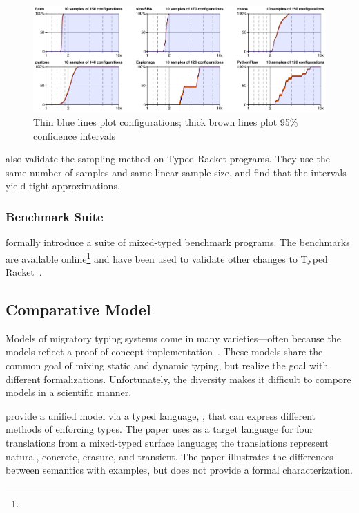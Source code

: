 \begin{figure}[t]
  \includegraphics[width=\columnwidth]{src/sampling.png}
  \caption{Thin blue lines plot  configurations; thick brown lines plot 95\% confidence intervals}
  \label{fig:sampling}
\end{figure}

\citet{gtnffvf-jfp-2019} also validate the sampling method on Typed Racket
 programs.
They use the same number of samples and same linear sample size, and find
 that the intervals yield tight approximations.



\subsubsection{Benchmark Suite}

\citet{gtnffvf-jfp-2019} formally introduce a suite of mixed-typed benchmark
 programs.
The benchmarks are available online\footnote{}
 and have been used to validate other changes to Typed Racket~\cite{gf-icfp-2018,bbst-oopsla-2017}.


\subsection{Comparative Model}

Models of migratory typing systems come in many varieties---often because
 the models reflect a proof-of-concept implementation~\cite{bat-ecoop-2014,wnlov-popl-2010,mt-oopsla-2017,vss-popl-2017,tf-popl-2008}.
These models share the common goal of mixing static and dynamic typing,
 but realize the goal with different formalizations.
Unfortunately, the diversity makes it difficult to compore models in a scientific manner.

\citet{clzv-ecoop-2018} provide a unified model via a typed language,
 \kafka{}, that can express different methods of enforcing types.
The paper uses \kafka{} as a target language for four translations from
 a mixed-typed surface language; the translations represent natural,
 concrete, erasure, and transient.
The paper illustrates the differences between semantics with examples,
 but does not provide a formal characterization.

